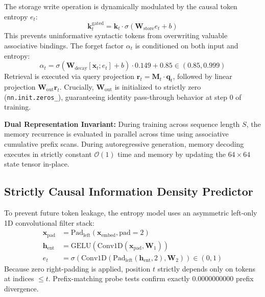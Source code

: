 \documentclass[10pt,twocolumn,letterpaper]{article}
\begin{document}
The storage write operation is dynamically modulated by the causal token entropy $e_t$:
\begin{equation}
    \mathbf{k}_t^{\text{gated}} = \mathbf{k}_t \cdot \sigma(\mathbf{W}_{\text{store}} e_t + b)
\end{equation}
This prevents uninformative syntactic tokens from overwriting valuable associative bindings. The forget factor $\alpha_t$ is conditioned on both input and entropy:
\begin{equation}
    \alpha_t = \sigma(\mathbf{W}_{\text{decay}} [\mathbf{x}_t; e_t] + b) \cdot 0.149 + 0.85 \in (0.85, 0.999)
\end{equation}
Retrieval is executed via query projection $\mathbf{r}_t = \mathbf{M}_t \cdot \mathbf{q}_t$, followed by linear projection $\mathbf{W}_{\text{out}} \mathbf{r}_t$. Crucially, $\mathbf{W}_{\text{out}}$ is initialized to strictly zero (\texttt{nn.init.zeros\_}), guaranteeing identity pass-through behavior at step 0 of training.

\textbf{Dual Representation Invariant:} During training across sequence length $S$, the memory recurrence is evaluated in parallel across time using associative cumulative prefix scans. During autoregressive generation, memory decoding executes in strictly constant $\mathcal{O}(1)$ time and memory by updating the $64 \times 64$ state tensor in-place.

\subsection{Strictly Causal Information Density Predictor}
To prevent future token leakage, the entropy model uses an asymmetric left-only 1D convolutional filter stack:
\begin{align}
    \mathbf{x}_{\text{pad}} &= \text{Pad}_{\text{left}}(\mathbf{x}_{\text{embed}}, \text{pad}=2) \\
    \mathbf{h}_{\text{ent}} &= \text{GELU}(\text{Conv1D}(\mathbf{x}_{\text{pad}}, \mathbf{W}_1)) \\
    e_t &= \sigma(\text{Conv1D}(\text{Pad}_{\text{left}}(\mathbf{h}_{\text{ent}}, 2), \mathbf{W}_2)) \in (0, 1)
\end{align}
Because zero right-padding is applied, position $t$ strictly depends only on tokens at indices $\le t$. Prefix-matching probe tests confirm exactly $0.0000000000$ prefix divergence.
\end{document}
